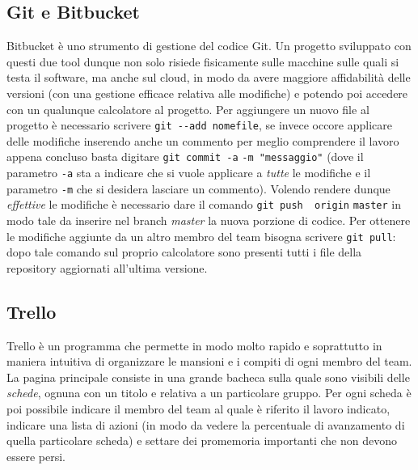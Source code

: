 	\subsection{Git e Bitbucket}
	Bitbucket è uno strumento di gestione del codice Git. Un
	progetto sviluppato con questi due tool dunque
	non solo risiede fisicamente sulle macchine sulle quali si testa il
	software, ma anche sul cloud, in modo da avere maggiore affidabilità delle
	versioni (con una gestione efficace relativa alle modifiche) e potendo poi
	accedere con un qualunque calcolatore al progetto. Per aggiungere un nuovo
	file al progetto è necessario scrivere               
	\verb|git --add nomefile|, se invece occore applicare delle modifiche
	inserendo anche un commento per meglio comprendere il lavoro appena concluso
	basta digitare \verb|git commit -a| \verb|-m "messaggio"| (dove il parametro
	\verb|-a| sta a indicare che si vuole applicare a \textit{tutte} le
	modifiche e il parametro \verb|-m| che si desidera lasciare un commento).
	Volendo rendere dunque \textit{effettive} le modifiche è necessario dare
	il comando \verb|git push  origin| \verb|master| in modo tale da inserire nel branch
	\textit{master} la nuova porzione di codice. Per ottenere le modifiche
	aggiunte da un altro membro del team bisogna scrivere \verb|git pull|:
	dopo tale comando sul proprio calcolatore sono presenti tutti i file della
	repository aggiornati all'ultima versione.

	\subsection{Trello}
	Trello è un programma che permette in modo molto rapido e soprattutto in
	maniera intuitiva di organizzare le mansioni e i compiti di ogni membro del
	team. La pagina principale consiste in una grande bacheca sulla quale sono
	visibili delle \textit{schede}, ognuna con un titolo e relativa a un
	particolare gruppo. Per ogni scheda è poi possibile indicare il membro del
	team al quale è riferito il lavoro indicato, indicare una lista di azioni
	(in modo da vedere la percentuale di avanzamento di quella particolare
	scheda) e settare dei promemoria importanti che non devono essere persi.

